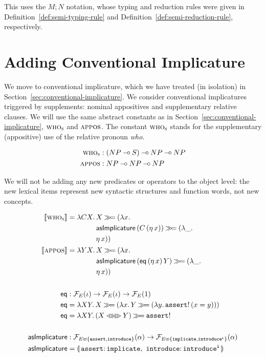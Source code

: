 This uses the $M; N$ notation, whose typing and reduction rules were given
in Definition~\ref{def:semi-typing-rule} and
Definition~\ref{def:semi-reduction-rule}, respectively.


\section{Adding Conventional Implicature}
\label{sec:adding-conventional-implicature}

We move to conventional implicature, which we have treated (in isolation)
in Section~\ref{sec:conventional-implicature}. We consider conventional
implicatures triggered by supplements: nominal appositives and
supplementary relative clauses. We will use the same abstract constants as
in Section~\ref{sec:conventional-implicature}, $\textsc{who}_{\textsc{s}}$ and
$\textsc{appos}$. The constant $\textsc{who}_{\textsc{s}}$ stands for the
supplementary (appositive) use of the relative pronoun \emph{who}.

\begin{align*}
  \textsc{who}_{\textsc{s}} &: (NP \mathbin{{-}\mkern-3.5mu{\circ}} S) \mathbin{{-}\mkern-3.5mu{\circ}} NP \mathbin{{-}\mkern-3.5mu{\circ}} NP \\
  \textsc{appos} &: NP \mathbin{{-}\mkern-3.5mu{\circ}} NP \mathbin{{-}\mkern-3.5mu{\circ}} NP
\end{align*}

We will not be adding any new predicates or operators to the object level:
the new lexical items represent new syntactic structures and function
words, not new concepts.

\begin{align*}
  \sem{\abs{who}_{\abs{s}}} &= \lam{C X}{\begin{aligned}[t]
      &X \hsbind (\lam{x}{ \\
      &\ap{\asImplicature}{(\ap{C}{(\etaE{x})})} \hsbind (\lam{\_}{ \\
      &\etaE{x}})})
    \end{aligned}} \\
  \lex{appos}{\lam{Y X}{\begin{aligned}[t]
      &X \hsbind (\lam{x}{ \\
      &\ap{\asImplicature}{(\app{\eq}{(\etaE{x})}{Y})} \hsbind (\lam{\_}{ \\
      &\etaE{x}})})
    \end{aligned}}} \\
  \\
  \eq &: \FF_E(\iota) \to \FF_E(\iota) \to \FF_E(1) \\
  \eq &= \lam{X Y}{X \hsbind (\lam{x}{Y \hsbind (\lam{y}{\ap{\op{assert}!}{(x = y)}})})} \\
  \eq &= \lam{X Y}{(X \eqlr Y) \hsbind \op{assert}!} \\
  \\
  \asImplicature &: \FF_{E \uplus \{\op{assert},\op{introduce}\}}(\alpha) \to
                    \FF_{E \uplus \{\op{implicate},\op{introduce^i}\}}(\alpha) \\
  \asImplicature &= \banana{\onto{\op{assert}}{\op{implicate}},\
                            \onto{\op{introduce}}{\op{introduce^i}}}
\end{align*}

